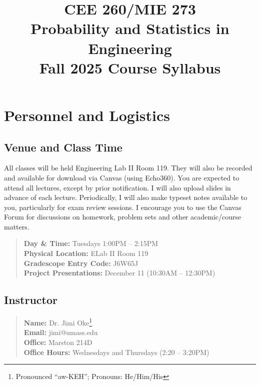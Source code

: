 \documentclass[11pt,twoside]{article}
\numberwithin{equation}{section}
\newcommand{\?}{\stackrel{?}{=}}
\begin{document}
\title{CEE 260/MIE 273 \\
  Probability and Statistics in Engineering \\
Fall 2025  Course Syllabus
}
\date{}
\maketitle

\thispagestyle{empty}

\tableofcontents

\eject
\section{Personnel and Logistics}

\subsection{Venue and Class Time}
All classes will be held Engineering Lab II Room 119. %
They will also be recorded and available for download via Canvas (using Echo360).  You are expected to
attend all lectures, except by prior notification.  I will also upload slides in advance of each lecture.  Periodically,
I will also make typeset notes available to you, particularly for exam review sessions.  I encourage you to use the Canvas
Forum for discussions on homework, problem sets and other
academic/course matters.

\begin{quote}\small
  \textbf{Day \& Time:} Tuesdays 1:00PM -- 2:15PM\\
  \textbf{Physical Location:} ELab II Room 119\\
 \textbf{Gradescope Entry Code:} J6W65J\\
\textbf{Project Presentations:} December 11 (10:30AM -- 12:30PM)
\end{quote}

\subsection{Instructor}
\begin{quote}\small
\textbf{Name:} Dr. Jimi Oke\footnote{Pronounced ``aw-KEH''; Pronouns: He/Him/His} \\
\textbf{Email:} jimi@umass.edu\\
\textbf{Office:} Marston 214D\\
\textbf{Office Hours:} Wednesdays and Thursdays (2:20 -- 3:20PM)
\end{quote}
\end{document}
